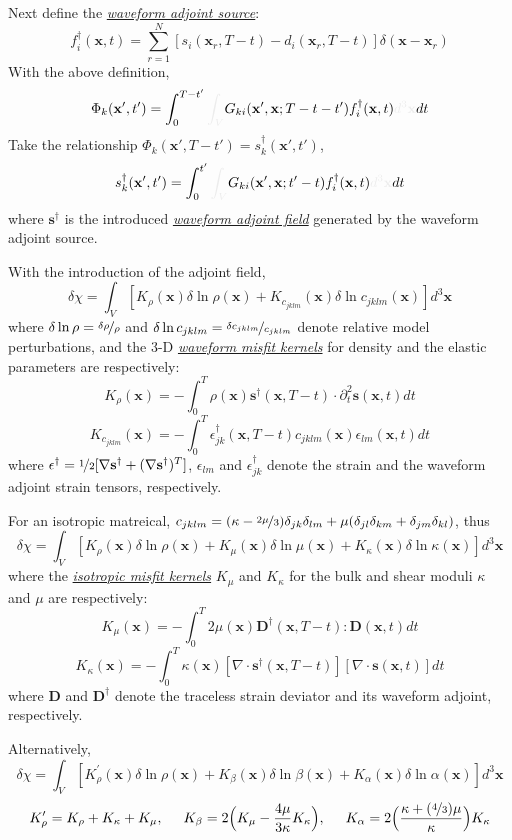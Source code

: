 \documentclass{article}
\newcommand{\mbf}[1]{\mathbf{#1}}
\newcommand{\mynem}[1]{\textsl{\uline{#1}}}
\newcommand{\myno}[1]{{\color{blue}#1}}
\newcommand{\myde}[1]{{\color{white!45!lightgray!55}#1}}
\begin{document}
Next define the \mynem{waveform adjoint source}:
\[ f_i^\dagger(\mbf x,t)=\sum_{r=1}^N[s_i(\mbf x_r,T-t)-d_i(\mbf x_r,T-t)]\delta(\mbf x-\mbf x_r) \]
With the above definition,
\[ \Phi_k(\mbf x',t')=\int_0^{T-t'}\myde{\int_V}G_{ki}(\mbf x',\mbf x;T-t-t')f_i^\dagger(\mbf x,t)\myde{d^3\mbf x}dt \]
Take the relationship $\Phi_k(\mbf x',T-t')=s_k^\dagger(\mbf x',t')$,
\[ s_k^\dagger(\mbf x',t')=\int_0^{t'}\myde{\int_V}G_{ki}(\mbf x',\mbf x;t'-t)f_i^\dagger(\mbf x,t)\myde{d^3\mbf x}dt \]
where $\mbf s^\dagger$ is the introduced \mynem{waveform adjoint field} generated by the waveform adjoint source.\par
With the introduction of the adjoint field,
\[ \delta\chi=\int_V[K_\rho(\mbf x)\delta\ln\rho(\mbf x)+K_{c_{jklm}}(\mbf x)\delta\ln c_{jklm}(\mbf x)]d^3\mbf x \]
where $\delta\ln\rho=\nicefrac{\delta\rho}{\rho}$ and $\delta\ln c_{jklm}=\nicefrac{\delta c_{jklm}}{c_{jklm}}$ denote relative model perturbations, and the 3-D \mynem{waveform misfit kernels} for density and the elastic parameters are respectively:
\[ K_\rho(\mbf x)=-\int_0^T\rho(\mbf x)\mbf s^\dagger(\mbf x,T-t)\cdot\partial_t^2\mbf s(\mbf x,t)dt \]
\[ K_{c_{jklm}}(\mbf x)=-\int_0^T\epsilon_{jk}^\dagger(\mbf x,T-t)c_{jklm}(\mbf x)\epsilon_{lm}(\mbf x,t)dt \]
where \myno{$\mbf\epsilon^\dagger=\nicefrac{1}{2}[\nabla\mbf s^\dagger+(\nabla\mbf s^\dagger)^T]$,} $\epsilon_{lm}$ and $\epsilon_{jk}^\dagger$ denote the strain and the waveform adjoint strain tensors, respectively.\par
For an isotropic matreical, $c_{jklm}=(\kappa-\nicefrac{2\mu}{3})\delta_{jk}\delta_{lm}+\mu(\delta_{jl}\delta_{km}+\delta_{jm}\delta_{kl})$, thus
\[ \delta\chi=\int_V[K_\rho(\mbf x)\delta\ln\rho(\mbf x)+K_\mu(\mbf x)\delta\ln\mu(\mbf x)+K_\kappa(\mbf x)\delta\ln\kappa(\mbf x)]d^3\mbf x \]
where the \mynem{isotropic misfit kernels} $K_\mu$ and $K_\kappa$ for the bulk and shear moduli $\kappa$ and $\mu$ are respectively:
\[ K_\mu(\mbf x)=-\int_0^T2\mu(\mbf x)\mbf D^\dagger(\mbf x,T-t):\mbf D(\mbf x,t)dt \]
\[ K_\kappa(\mbf x)=-\int_0^T\kappa(\mbf x)[\nabla\cdot\mbf s^\dagger(\mbf x,T-t)][\nabla\cdot\mbf s(\mbf x,t)]dt \]
where $\mbf D$ and $\mbf D^\dagger$ denote the traceless strain deviator and its waveform adjoint, respectively.\par
Alternatively,
\[ \delta\chi=\int_V[K_\rho^\prime(\mbf x)\delta\ln\rho(\mbf x)+K_\beta(\mbf x)\delta\ln\beta(\mbf x)+K_\alpha(\mbf x)\delta\ln\alpha(\mbf x)]d^3\mbf x \]
\[ K_\rho^\prime=K_\rho+K_\kappa+K_\mu, \hspace{5mm} K_\beta=2\Big(K_\mu-\frac{4\mu}{3\kappa}K_\kappa\Big), \hspace{5mm} K_\alpha=2\Big(\frac{\kappa+(\nicefrac{4}{3})\mu}{\kappa}\Big)K_\kappa \]\par
\end{document}

